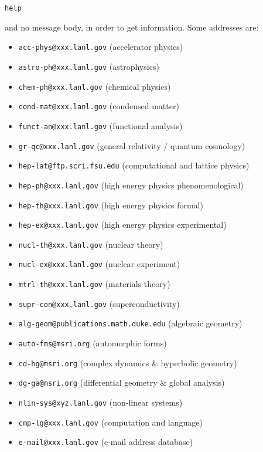 \documentclass{article}
\begin{document}
\begin{verbatim}
help
\end{verbatim}

and no message body, in order to get information. Some addresses are:

\begin{itemize}
\item
  \texttt{acc-phys@xxx.lanl.gov} (accelerator physics)
\item
  \texttt{astro-ph@xxx.lanl.gov} (astrophysics)
\item
  \texttt{chem-ph@xxx.lanl.gov} (chemical physics)
\item
  \texttt{cond-mat@xxx.lanl.gov} (condensed matter)
\item
  \texttt{funct-an@xxx.lanl.gov} (functional analysis)
\item
  \texttt{gr-qc@xxx.lanl.gov} (general relativity / quantum cosmology)
\item
  \texttt{hep-lat@ftp.scri.fsu.edu} (computational and lattice physics)
\item
  \texttt{hep-ph@xxx.lanl.gov} (high energy physics phenomenological)
\item
  \texttt{hep-th@xxx.lanl.gov} (high energy physics formal)
\item
  \texttt{hep-ex@xxx.lanl.gov} (high energy physics experimental)
\item
  \texttt{nucl-th@xxx.lanl.gov} (nuclear theory)
\item
  \texttt{nucl-ex@xxx.lanl.gov} (nuclear experiment)
\item
  \texttt{mtrl-th@xxx.lanl.gov} (materials theory)
\item
  \texttt{supr-con@xxx.lanl.gov} (superconductivity)
\item
  \texttt{alg-geom@publications.math.duke.edu} (algebraic geometry)
\item
  \texttt{auto-fms@msri.org} (automorphic forms)
\item
  \texttt{cd-hg@msri.org} (complex dynamics \& hyperbolic geometry)
\item
  \texttt{dg-ga@msri.org} (differential geometry \& global analysis)
\item
  \texttt{nlin-sys@xyz.lanl.gov} (non-linear systems)
\item
  \texttt{cmp-lg@xxx.lanl.gov} (computation and language)
\item
  \texttt{e-mail@xxx.lanl.gov} (e-mail address database)
\end{itemize}
\end{document}
